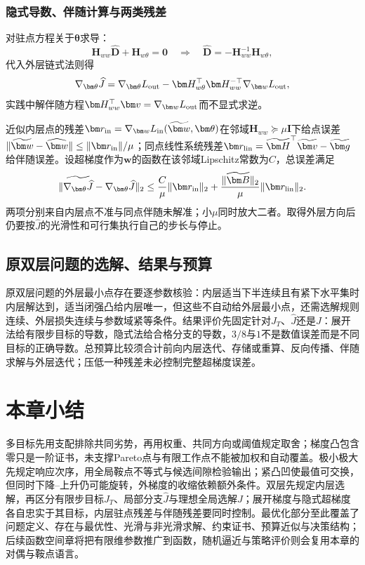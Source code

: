\subsubsection{隐式导数、伴随计算与两类残差}

对驻点方程关于$\bm\theta$求导：
\[
 \bm H_{ww}\widehat{\bm D}+\bm H_{w\theta}=\bm0
 \quad\Longrightarrow\quad
 \widehat{\bm D}=-\bm H_{ww}^{-1}\bm H_{w\theta},
\]
代入外层链式法则得
\begin{equation}
 \nabla_{\bm\theta}\widehat J
 =\nabla_{\bm\theta}L_{\rm out}
 -\bm H_{w\theta}^\top\bm H_{ww}^{-\top}\nabla_{\bm w}L_{\rm out},
 \label{eq:opt-implicit-hypergradient}
\end{equation}
实践中解伴随方程$\bm H_{ww}^\top\bm v=\nabla_{\bm w}L_{\rm out}$而不显式求逆。

近似内层点的残差$\bm r_{\rm in}=\nabla_{\bm w}L_{\rm in}(\widetilde{\bm w},\bm\theta)$在邻域$\bm H_{ww}\succeq\mu\bm I$下给点误差$\|\widetilde{\bm w}-\widehat{\bm w}\|\leq\|\bm r_{\rm in}\|/\mu$；同点线性系统残差$\bm r_{\rm lin}=\widetilde{\bm H}^\top\widetilde{\bm v}-\widetilde{\bm g}$给伴随误差。设超梯度作为$\bm w$的函数在该邻域Lipschitz常数为$C$，总误差满足
\begin{equation}
 \|\widetilde{\nabla_{\bm\theta}\widehat J}
 -\nabla_{\bm\theta}\widehat J\|_2
 \leq\frac{C}{\mu}\|\bm r_{\rm in}\|_2
 +\frac{\|\widetilde{\bm B}\|_2}{\mu}\|\bm r_{\rm lin}\|_2.
 \label{eq:opt-hypergradient-two-residuals}
\end{equation}
两项分别来自内层点不准与同点伴随未解准；小$\mu$同时放大二者。取得外层方向后仍要按$\widehat J$的光滑性和可行集执行自己的步长与停止。

\subsection{原双层问题的选解、结果与预算}

原双层问题的外层最小点存在要逐参数核验：内层适当下半连续且有紧下水平集时内层解达到，适当闭强凸给内层唯一，但这些不自动给外层最小点，还需选解规则连续、外层损失连续与参数域紧等条件。结果评价先固定针对$J_T$、$\widehat J$还是$J$：展开法给有限步目标的导数，隐式法给合格分支的导数，$3/8$与$1$不是数值误差而是不同目标的正确导数。总预算比较须合计前向内层迭代、存储或重算、反向传播、伴随求解与外层迭代；压低一种残差未必控制完整超梯度误差。

\section{本章小结}

多目标先用支配排除共同劣势，再用权重、共同方向或阈值规定取舍；梯度凸包含零只是一阶证书，未支撑Pareto点与有限工作点不能被加权和自动覆盖。极小极大先规定响应次序，用全局鞍点不等式与候选间隙检验输出；紧凸凹使最值可交换，但同时下降--上升仍可能旋转，外梯度的收缩依赖额外条件。双层先规定内层选解，再区分有限步目标$J_T$、局部分支$\widehat J$与理想全局选解$J$；展开梯度与隐式超梯度各自忠实于其目标，内层驻点残差与伴随残差要同时控制。最优化部分至此覆盖了问题定义、存在与最优性、光滑与非光滑求解、约束证书、预算近似与决策结构；后续函数空间章将把有限维参数推广到函数，随机逼近与策略评价则会复用本章的对偶与鞍点语言。

